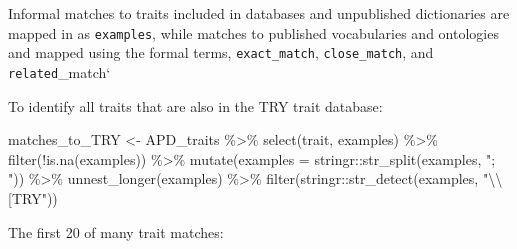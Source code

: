 \documentclass[
  letterpaper,
  DIV=11,
  numbers=noendperiod]{scrartcl}
\newenvironment{Shaded}{\begin{snugshade}}{\end{snugshade}}
\newcommand{\AttributeTok}[1]{\textcolor[rgb]{0.40,0.45,0.13}{#1}}
\newcommand{\FunctionTok}[1]{\textcolor[rgb]{0.28,0.35,0.67}{#1}}
\newcommand{\NormalTok}[1]{\textcolor[rgb]{0.00,0.23,0.31}{#1}}
\newcommand{\OtherTok}[1]{\textcolor[rgb]{0.00,0.23,0.31}{#1}}
\newcommand{\SpecialCharTok}[1]{\textcolor[rgb]{0.37,0.37,0.37}{#1}}
\newcommand{\StringTok}[1]{\textcolor[rgb]{0.13,0.47,0.30}{#1}}
\begin{document}
Informal matches to traits included in databases and unpublished
dictionaries are mapped in as \texttt{examples}, while matches to
published vocabularies and ontologies and mapped using the formal terms,
\texttt{exact\_match}, \texttt{close\_match}, and
\texttt{related}\_match`

To identify all traits that are also in the TRY trait database:

\begin{Shaded}
\begin{Highlighting}[]
\NormalTok{matches\_to\_TRY }\OtherTok{\textless{}{-}} 
\NormalTok{  APD\_traits }\SpecialCharTok{\%\textgreater{}\%}
  \FunctionTok{select}\NormalTok{(trait, examples) }\SpecialCharTok{\%\textgreater{}\%}
  \FunctionTok{filter}\NormalTok{(}\SpecialCharTok{!}\FunctionTok{is.na}\NormalTok{(examples)) }\SpecialCharTok{\%\textgreater{}\%}
  \FunctionTok{mutate}\NormalTok{(}\AttributeTok{examples =}\NormalTok{ stringr}\SpecialCharTok{::}\FunctionTok{str\_split}\NormalTok{(examples, }\StringTok{"; "}\NormalTok{)) }\SpecialCharTok{\%\textgreater{}\%}
  \FunctionTok{unnest\_longer}\NormalTok{(examples) }\SpecialCharTok{\%\textgreater{}\%}
  \FunctionTok{filter}\NormalTok{(stringr}\SpecialCharTok{::}\FunctionTok{str\_detect}\NormalTok{(examples, }\StringTok{"}\SpecialCharTok{\textbackslash{}\textbackslash{}}\StringTok{[TRY"}\NormalTok{))}
\end{Highlighting}
\end{Shaded}

The first 20 of many trait matches:
\end{document}
